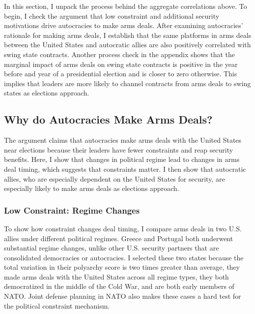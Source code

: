 \documentclass[12pt]{article}
\begin{document}
In this section, I unpack the process behind the aggregate correlations above.  
To begin, I check the argument that low constraint and additional security motivations drive autocracies to make arms deals.
After examining autocracies' rationale for making arms deals, I establish that the same platforms in arms deals between the United States and autocratic allies are also positively correlated with swing state contracts.
Another process check in the appendix shows that the marginal impact of arms deals on swing state contracts is positive in the year before and year of a presidential election and is closer to zero otherwise.
This implies that leaders are more likely to channel contracts from arms deals to swing states as elections approach. 



\subsection{Why do Autocracies Make Arms Deals?}


The argument claims that autocracies make arms deals with the United States near elections because their leaders have fewer constraints and reap security benefits. 
Here, I show that changes in political regime lead to changes in arms deal timing, which suggests that constraints matter. 
I then show that autocratic allies, who are especially dependent on the United States for security, are especially likely to make arms deals as elections approach.


\subsubsection{Low Constraint: Regime Changes}


To show how constraint changes deal timing, I compare arms deals in two U.S. allies under different political regimes. 
Greece and Portugal both underwent substantial regime changes, unlike other U.S. security partners that are consolidated democracies or autocracies. 
I selected these two states because the total variation in their polyarchy score is two times greater than average, they made arms deals with the United States across all regime types, they both democratized in the middle of the Cold War, and are both early members of NATO. 
Joint defense planning in NATO also makes these cases a hard test for the political constraint mechanism.
\end{document}
